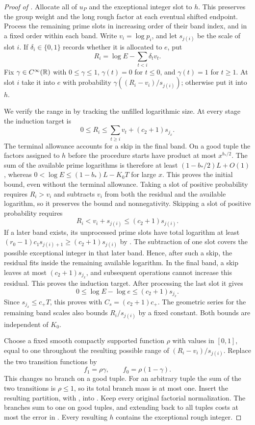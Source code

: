 \begin{proof}[Proof of ]
Allocate all of $u_P$ and the exceptional integer slot to $h$. This
preserves the group weight and the long rough factor at each eventual
shifted endpoint. Process the remaining prime slots in increasing order
of their band index, and in a fixed order within each band. Write
$v_i=\log p_i$, and let $s_{j(i)}$ be the scale of slot $i$. If
$\delta_i\in\{0,1\}$ records whether it is allocated to $e$, put
\[
 R_i=\log E-\sum_{t<i}\delta_tv_t.
\]
Fix $\gamma\in C^\infty(\mathbb R)$ with $0\leq\gamma\leq1$,
$\gamma(t)=0$ for $t\leq0$, and $\gamma(t)=1$ for $t\geq1$.
At slot $i$ take it into $e$ with probability
$\gamma((R_i-v_i)/s_{j(i)})$; otherwise put it into $h$.

We verify the range in  by tracking the
unfilled logarithmic size. At every stage the induction target is
\[
 0\leq R_i\leq\sum_{t\geq i}v_t+(c_2+1)s_{j_x}.
\]
The terminal allowance accounts for a skip in the final band.
On a good tuple the factors assigned to $h$ before the procedure starts
have product at most $x^{b_*/2}$. The sum of the available prime logarithms is therefore
at least $(1-b_*/2)L+O(1)$, whereas
$0<\log E\leq(1-b_*)L-K_0T$ for large $x$. This proves the initial
bound, even without the terminal allowance. Taking a slot of positive
probability requires $R_i>v_i$ and subtracts $v_i$ from both the residual
and the available logarithm, so it preserves the bound and nonnegativity.
Skipping a slot of positive probability requires
\begin{equation}\label{eq:typeii-skip}
              R_i<v_i+s_{j(i)}\leq(c_2+1)s_{j(i)}.
\end{equation}
If a later band exists, its unprocessed prime slots have total logarithm
at least $(r_0-1)c_1s_{j(i)+1}\geq(c_2+1)s_{j(i)}$ by
. The subtraction of one slot covers the
possible exceptional integer in that later band. Hence, after such a skip,
the residual fits inside the remaining available logarithm. In the final
band, a skip leaves at most $(c_2+1)s_{j_x}$, and subsequent operations
cannot increase this residual. This proves the induction target.
After processing the last slot it gives
\[
 0\leq\log E-\log e\leq(c_2+1)s_{j_x}.
\]
Since $s_{j_x}\leq c_+T$, this proves
 with $C_s=(c_2+1)c_+$. The geometric series
for the remaining band scales also bounds $R_i/s_{j(i)}$ by a fixed
constant. Both bounds are independent of $K_0$.

Choose a fixed smooth compactly supported function $\rho$ with values in
$[0,1]$, equal to one throughout the resulting possible range of
$(R_i-v_i)/s_{j(i)}$. Replace the two transition functions by
\[
              f_1=\rho\gamma,\qquad f_0=\rho(1-\gamma).
\]
This changes no branch on a good tuple. For an arbitrary tuple the sum
of the two transitions is $\rho\leq1$, so its total branch mass is at
most one. Insert the resulting partition, with
, into . Keep every
original factorial normalization. The branches sum to one on good
tuples, and extending back to all tuples costs at most the error in
. Every resulting $h$ contains the exceptional
rough integer.


\end{proof}
